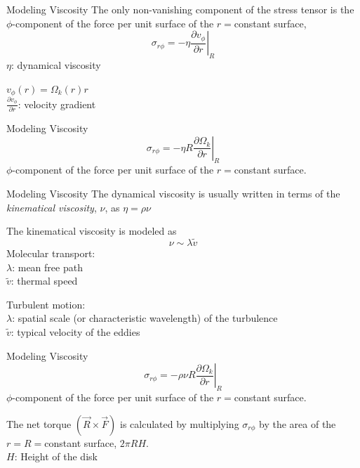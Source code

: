 \documentclass{beamer}
\begin{document}
\begin{frame}{Modeling Viscosity}
	The only non-vanishing component of the stress tensor is the $\phi$-component of the force per unit surface of the $r=$constant surface,  
	\[\sigma_{r\phi} = -\eta \left. \frac{\partial v_\phi}{\partial r} \right|_R \]
	\pause
	$\eta$: dynamical viscosity\\
	\bigskip
	
	$v_\phi (r) = \Omega_k (r) r$\\
	$\frac{\partial v_\phi}{\partial r}$: velocity gradient
\end{frame}

\begin{frame}{Modeling Viscosity}
	\[\sigma_{r\phi} = -\eta R \left. \frac{\partial \Omega_k}{\partial r} \right|_R \]
	$\phi$-component of the force per unit surface of the $r=$constant surface.
\end{frame}

\begin{frame}{Modeling Viscosity}
	The dynamical viscosity is usually written in terms of the \textit{kinematical viscosity}, $\nu$, as $\eta = \rho \nu$\\
	\bigskip
	\pause	
	 
	The kinematical viscosity is modeled as
	\[ \nu \sim \lambda \tilde{v}\]
	\pause
	Molecular transport:\\
	$\lambda$: mean free path\\
	$\tilde{v}$: thermal speed\\
	\bigskip
	\pause
	
	Turbulent motion:\\
	$\lambda$: spatial scale (or characteristic wavelength) of the turbulence\\
	$\tilde{v}$: typical velocity of the eddies\\
\end{frame}

\begin{frame}{Modeling Viscosity}
	\[\sigma_{r\phi} = -\rho \nu R \left. \frac{\partial \Omega_k}{\partial r} \right|_R \]
	$\phi$-component of the force per unit surface of the $r=$constant surface.\\
	\bigskip
	\pause
	
	The net torque $(\vec{R}\times \vec{F} )$ is calculated by multiplying $\sigma_{r\phi} $ by the area of the $r=R=$constant surface, $ 2\pi R H $.\\
	\pause
	$H$: Height of the disk
\end{frame}
\end{document}
